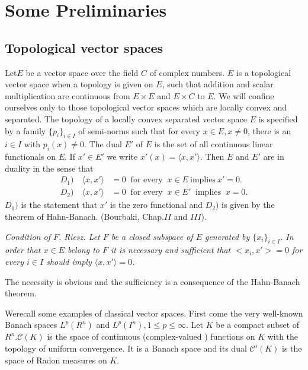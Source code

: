 
\chapter{Some Preliminaries}\label{chap2}

\section{Topological vector spaces}\label{chap2:sec1}

Let\pageoriginale $E$ be a vector space over the field $C$ of complex numbers. $E$
is a topological vector space when a topology is given on $E$, such
that addition and scalar multiplication are continuous from $E \times
E$ and $E \times C$ to $E$. We will confine ourselves only to those
topological vector spaces which are locally convex and separated. 
The topology of a locally convex separated vector space $E$ is
specified by a family $\{p_i \}_{i \in I}$ of semi-norms such that for
every $x \in E, x \neq 0$, there is an $i \in I$ with $p_i (x) \neq
0$. The dual $E'$ of $E$ is the set of all continuous linear
functionals on $E$. If $x' \in E'$ we write $x'(x) = \langle x, x'
\rangle$. Then $E$ and $E'$ are in duality in the sense that 
\begin{align*}
 D_1) \quad \langle x, x' \rangle &= 0~ \text{ for every }~ x \in E ~\text{
 implies}~ x' = 0. \\ 
 D_2) \quad \langle x, x' \rangle &= 0 ~\text{ for every }~ x \in E'
 ~\text{ implies }~ x = 0. 
\end{align*}
$D_1)$ is the statement that $x'$ is the zero functional and $D_2)$ is
given by the theorem of Hahn-Banach. (Bourbaki, Chap.$II$ and $III$). 

\textit{Condition of $F$. Riesz. Let $F$ be a closed subspace of $E$
 generated by $\{ x_i \}_{ i \in I}$. In order that $x \in E$ belong
 to $F$ it is necessary and sufficient that $ < x_i, x' >
 = 0$ for every $i \in I$ should imply $\langle x, x' \rangle = 0$.} 

The necessity is obvious and the sufficiency is a consequence of the
Hahn-Banach theorem. 

We\pageoriginale recall some examples of classical vector spaces. First come the
very well-known Banach spaces $L^p (R^n)$ and $L^p (I^n), 1 \leq p
\leq \infty$. Let $K$ be a compact subset of $R^n. \mathscr{C}(K)$ is
the space of continuous (complex-valued ) functions on $K$ with the
topology of uniform convergence. It is a Banach space and its dual
$\mathscr{C}'(K)$ is the space of Radon measures on $K$. 

